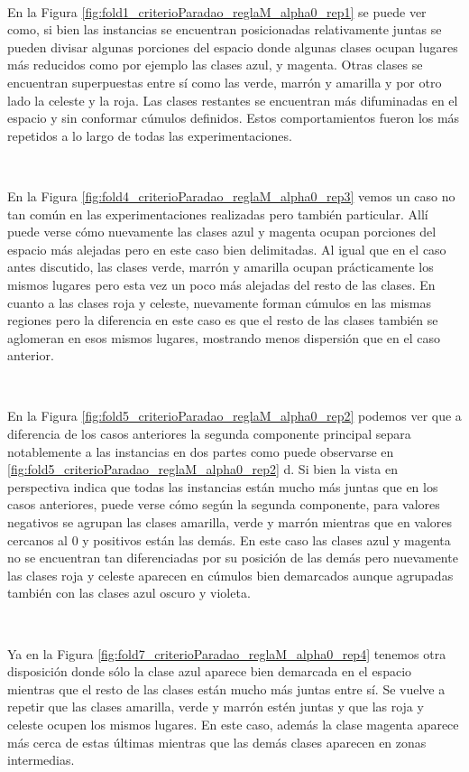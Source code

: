 \documentclass[informe.tex]{subfiles}
\begin{document}
	~
	
	En la Figura \ref{fig:fold1_criterioParadao_reglaM_alpha0_rep1} se puede ver como, si bien las instancias se encuentran posicionadas relativamente juntas se pueden divisar algunas porciones del espacio donde algunas clases ocupan lugares m\'as reducidos como por ejemplo las clases azul, y magenta. Otras clases se encuentran superpuestas entre sí como las verde, marrón y amarilla y por otro lado la celeste y la roja. Las clases restantes se encuentran más difuminadas en el espacio y sin conformar cúmulos definidos. Estos comportamientos fueron los más repetidos a lo largo de todas las experimentaciones.
	
	~
	
	En la Figura \ref{fig:fold4_criterioParadao_reglaM_alpha0_rep3} vemos un caso no tan común en las experimentaciones realizadas pero también particular. Allí puede verse cómo nuevamente las clases azul y magenta ocupan porciones del espacio más alejadas pero en este caso bien delimitadas. Al igual que en el caso antes discutido, las clases verde, marrón y amarilla ocupan prácticamente los mismos lugares pero esta vez un poco más alejadas del resto de las clases. En cuanto a las clases roja y celeste, nuevamente forman cúmulos en las mismas regiones pero la diferencia en este caso es que el resto de las clases también se aglomeran en esos mismos lugares, mostrando menos dispersión que en el caso anterior.
	
	~
	
	En la Figura \ref{fig:fold5_criterioParadao_reglaM_alpha0_rep2} podemos ver que a diferencia de los casos anteriores la segunda componente principal separa notablemente a las instancias en dos partes como puede observarse en \ref{fig:fold5_criterioParadao_reglaM_alpha0_rep2} d. Si bien la vista en perspectiva indica que todas las instancias están mucho más juntas que en los casos anteriores, puede verse cómo según la segunda componente, para valores negativos se agrupan las clases amarilla, verde y marrón mientras que en valores cercanos al 0 y positivos están las demás. En este caso las clases azul y magenta no se encuentran tan diferenciadas por su posición de las demás pero nuevamente las clases roja y celeste aparecen en cúmulos bien demarcados aunque agrupadas también con las clases azul oscuro y violeta. 
	
	~
	
	Ya en la Figura \ref{fig:fold7_criterioParadao_reglaM_alpha0_rep4} tenemos otra disposición donde sólo la clase azul aparece bien demarcada en el espacio mientras que el resto de las clases están mucho más juntas entre sí. Se vuelve a repetir que las clases amarilla, verde y marrón estén juntas y que las roja y celeste ocupen los mismos lugares. En este caso, además la clase magenta aparece más cerca de estas últimas mientras que las demás clases aparecen en zonas intermedias.
	
\end{document}
